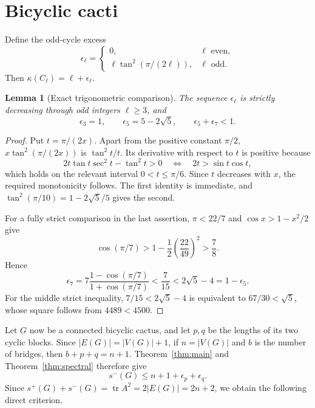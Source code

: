 \documentclass[11pt]{article}
\newtheorem{lemma}[theorem]{Lemma}
\theoremstyle{remark}
\newcommand{\tr}{\operatorname{tr}}
\begin{document}
\section{Bicyclic cacti}

Define the odd-cycle excess
\begin{equation}\label{eq:epsilon}
 \epsilon_\ell=
 \begin{cases}
  0,&\ell\text{ even},\\
  \ell\tan^2(\pi/(2\ell)),&\ell\text{ odd}.
 \end{cases}
\end{equation}
Then $\kappa(C_\ell)=\ell+\epsilon_\ell$.

\begin{lemma}[Exact trigonometric comparison]\label{lem:trig}
The sequence $\epsilon_\ell$ is strictly decreasing through odd integers
$\ell\geq3$, and
\[
 \epsilon_3=1,
 \qquad
 \epsilon_5=5-2\sqrt5,
 \qquad
 \epsilon_5+\epsilon_7<1.
\]
\end{lemma}

\begin{proof}
Put $t=\pi/(2x)$.  Apart from the positive constant $\pi/2$,
$x\tan^2(\pi/(2x))$ is $\tan^2t/t$.  Its derivative with respect to $t$ is
positive because
\[
 2t\tan t\sec^2t-\tan^2t>0
 \quad\Longleftrightarrow\quad
 2t>\sin t\cos t,
\]
 which holds on the relevant interval $0<t\leq\pi/6$.  Since $t$ decreases with $x$, the required
monotonicity follows.  The first identity is immediate, and
$\tan^2(\pi/10)=1-2\sqrt5/5$ gives the second.

For a fully strict comparison in the last assertion, $\pi<22/7$ and
$\cos x>1-x^2/2$ give
\[
 \cos(\pi/7)>1-\frac12\left(\frac{22}{49}\right)^2>\frac78.
\]
Hence
\[
 \epsilon_7
 =7\frac{1-\cos(\pi/7)}{1+\cos(\pi/7)}
 <\frac7{15}<2\sqrt5-4=1-\epsilon_5.
\]
For the middle strict inequality, $7/15<2\sqrt5-4$ is equivalent to
$67/30<\sqrt5$, whose square follows from $4489<4500$.
\end{proof}

Let $G$ now be a connected bicyclic cactus, and let $p,q$ be the lengths of
its two cyclic blocks.  Since $|E(G)|=|V(G)|+1$, if $n=|V(G)|$ and $b$ is
the number of bridges, then $b+p+q=n+1$.  Theorem~\ref{thm:main} and
Theorem~\ref{thm:spectral} therefore give
\begin{equation}\label{eq:bicyclic-negative}
 s^-(G)\leq n+1+\epsilon_p+\epsilon_q.
\end{equation}
Since $s^+(G)+s^-(G)=\tr A^2=2|E(G)|=2n+2$, we obtain the following direct
criterion.
\end{document}
